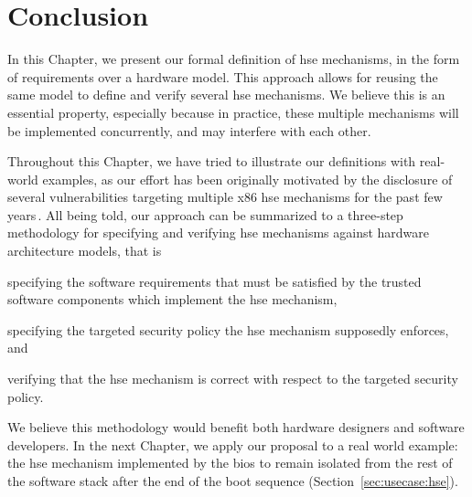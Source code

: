 
\section{Conclusion}

In this Chapter, we present our formal definition of \ac{hse} mechanisms, in the
form of requirements over a hardware model.
%
This approach allows for reusing the same model to define and verify several
\ac{hse} mechanisms.
%
We believe this is an essential property, especially because in practice, these
multiple mechanisms will be implemented concurrently, and may interfere with
each other.


Throughout this Chapter, we have tried to illustrate our definitions with
real-world examples, as our effort has been originally motivated by the
disclosure of several vulnerabilities targeting multiple x86 \ac{hse} mechanisms
for the past few
years\,\cite{wojtczuk2009smram,duflot2009smram,rutkowska2008remap,domas2015sinkhole,kallenberg2015racecondition}.
%
All being told, our approach can be summarized to a three-step methodology for
specifying and verifying \ac{hse} mechanisms against hardware architecture
models, that is
%
\begin{inparaenum}[(1)]
\item specifying the software requirements that must be satisfied by the trusted
  software components which implement the \ac{hse} mechanism,
%
\item specifying the targeted security policy the \ac{hse} mechanism supposedly
  enforces, and
%
\item verifying that the \ac{hse} mechanism is correct with respect to the
  targeted security policy.
\end{inparaenum}
%
We believe this methodology would benefit both hardware designers and software
developers.
%
In the next Chapter, we apply our proposal to a real world example: the \ac{hse}
mechanism implemented by the \ac{bios} to remain isolated from the rest of the
software stack after the end of the boot sequence
(Section~\ref{sec:usecase:hse}).
